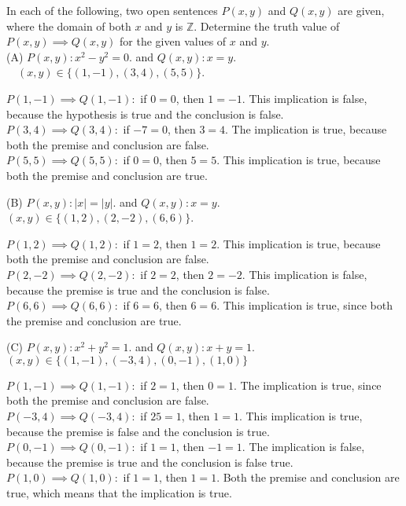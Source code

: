 \documentclass[12pt]{article}
\newcommand{\Z}{\mathbb{Z}}
\newenvironment{problem}[2][Problem]{\begin{trivlist}
		\item[\hskip \labelsep {\bfseries #1}\hskip \labelsep {\bfseries #2.}]}{\end{trivlist}}
\newenvironment{solution}[2][Solution]{\begin{trivlist}
		\item[\hskip \labelsep {\bfseries #1}\hskip \labelsep {\bfseries #2.}]}{\end{trivlist}}
\begin{document}
\begin{problem}{33}
	In each of the following, two open sentences $P(x,y)$ and $Q(x,y)$ are given, where the domain of both $x$ and $y$ is $\Z$. Determine the truth value of $P(x,y) \implies Q(x,y)$ for the given values of $x$ and $y$.\\
	
	(A) $P(x,y): x^{2} - y^{2} = 0.$ and $Q(x,y): x = y.$\\
		$\quad (x,y) \in \{(1,-1),(3,4),(5,5)\}$. 
		\begin{solution}{a}
			$P(1,-1) \implies Q(1,-1):$ if $0 = 0$, then $1 = -1$. This implication is false, because the hypothesis is true and the conclusion is false.\\
			$P(3,4) \implies Q(3,4):$ if $-7 = 0$, then $3 = 4$. The implication is true, because both the premise and conclusion are false.\\
			$P(5,5) \implies Q(5,5):$ if $0 = 0$, then $5 = 5$. This implication is true, because both the premise and conclusion are true.
		\end{solution}
	(B) $P(x,y): \vert{x}\vert = \vert{y}\vert.$ and $Q(x,y): x= y$. \\
	$(x,y) \in \{(1,2), (2,-2), (6,6)\}$.
	\begin{solution}{b}
		$P(1,2) \implies Q(1,2):$ if $1 = 2$, then $1 = 2$. This implication is true, because both the premise and conclusion are false.\\
		$P(2,-2) \implies Q(2,-2):$ if $2 = 2$, then $2 = -2$. This implication is false, because the premise is true and the conclusion is false.\\
		$P(6,6) \implies Q(6,6):$ if $6 = 6$, then $6 = 6$. This implication is true, since both the premise and conclusion are true.
	\end{solution}
	(C) $P(x,y): x^{2} + y^{2} = 1.$ and $Q(x,y): x + y = 1$.\\
	$(x,y) \in \{(1,-1), (-3,4), (0,-1), (1,0)\}$
	\begin{solution}{c}
		$P(1,-1) \implies Q(1,-1): $ if $2 = 1$, then $0 = 1$. The implication is true, since both the premise and conclusion are false.\\
		$P(-3,4) \implies Q(-3,4): $ if $25 = 1$, then $1 = 1$. This implication is true, because the premise is false and the conclusion is true.\\
		$P(0,-1) \implies Q(0,-1):$ if $1 = 1$, then $-1 = 1$. The implication is false, because the premise is true and the conclusion is false true.\\
		$P(1,0) \implies Q(1,0):$ if $1 = 1$, then $1 = 1$. Both the premise and conclusion are true, which means that the implication is true.
	\end{solution}
\end{problem}
\end{document}

